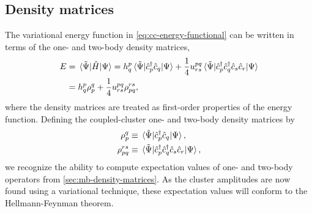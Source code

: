         \subsection{Density matrices}
            \label{subsec:cc-density-matrices}
            The variational energy function in \autoref{eq:cc-energy-functional}
            can be written in terms of the one- and two-body density matrices,
            \begin{align}
                E
                &= \mel*{\tilde{\Psi}}{\hat{H}}{\Psi}
                = h^{p}_{q}
                \mel*{\tilde{\Psi}}{\hat{c}_{p}^{\dagger}\hat{c}_{q}}{\Psi}
                + \frac{1}{4}
                u^{pq}_{rs}
                \mel*{\tilde{\Psi}}{\hat{c}_{p}^{\dagger}\hat{c}_{q}^{\dagger}\hat{c}_{s}\hat{c}_{r}}{\Psi}
                \\
                &=
                h^{p}_{q} \rho^{q}_{p}
                + \frac{1}{4}
                u^{pq}_{rs}
                \rho^{rs}_{pq},
            \end{align}
            where the density matrices are treated as first-order properties of
            the energy function.
            Defining the coupled-cluster one- and two-body density matrices by
            \begin{align}
                \rho^{q}_{p}
                &\equiv \mel*{\tilde{\Psi}}{\hat{c}_{p}^{\dagger}\hat{c}_{q}}{\Psi},
                \label{eq:cc-one-body-density}
                \\
                \rho^{rs}_{pq}
                &\equiv
                \mel*{\tilde{\Psi}}{
                    \hat{c}_{p}^{\dagger}\hat{c}_{q}^{\dagger}\hat{c}_{s}\hat{c}_{r}
                }{\Psi},
                \label{eq:cc-two-body-density}
            \end{align}
            we recognize the ability to compute expectation values of one- and
            two-body operators from \autoref{sec:mb-density-matrices}.
            As the cluster amplitudes are now found using a variational
            technique, these expectation values will conform to the
            Hellmann-Feynman theorem.

